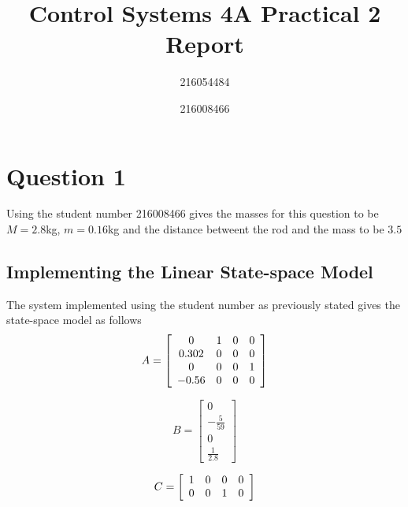 \documentclass[a4paper, 12pt]{article}
\title{Control Systems 4A Practical 2 Report}
\author{216054484 \and 216008466}
\begin{document}
\begin{titlepage}
  \maketitle
\end{titlepage}

\tableofcontents
\newpage
{}

\section{Question 1} %
\label{sec:question_1}
Using the student number 216008466 gives the masses for this question to be $M = 2.8$kg, $m = 0.16$kg and the distance betweent the rod and the mass to be $3.5$

\subsection{Implementing the Linear State-space Model} %
\label{sub:implementing_the_linear_state_space_model}
The system implemented  using the student number as previously stated gives the state-space model as follows 
\begin{equation}
  A = \left[
  \begin{array}{c c c c}
   	0 & 1 & 0 & 0 \\
   	0.302 &  0 & 0 & 0\\
   	0 & 0 & 0 & 1\\
   	-0.56 &  0 &  0 &  0\\
  \end{array}
  \right]
  \label{eq:a_q1}
\end{equation}

\begin{equation}
  B = \left[
  \begin{array}{c}
   0 \\-\frac{5}{59}\\ 0\\\frac{1}{2.8}
  \end{array}
  \right]
  \label{eq:b_q1}
\end{equation}

\begin{equation}
  C = \left[
  \begin{array}{c c c c}
    1 & 0 & 0 & 0\\
    0 & 0 & 1 & 0\\
  \end{array}
  \right]
  \label{eq:c_q1}
\end{equation}
\end{document}

